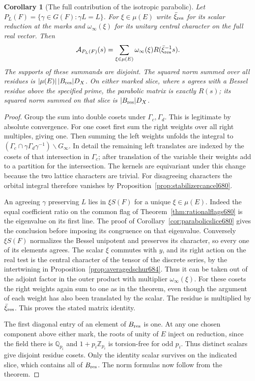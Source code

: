 \documentclass[a4paper,11pt]{article}
\newtheorem{corollary}[proposition]{Corollary}
\theoremstyle{definition}
\theoremstyle{remark}
\numberwithin{equation}{section}
\begin{document}
\begin{corollary}[The full contribution of the isotropic parabolic]\leavevmode
\label{cor:parabolicmass701}
Let \(P_L(F)=\{\gamma\in G(F):\gamma L=L\}\). For
\(\xi\in\mu(E)\) write \(\bar\xi_{\rm res}\) for its scalar
reduction at the marks and \(\omega_\infty(\xi)\) for its
unitary central character on the full real vector. Then
\[
       \mathcal A_{P_L(F)}(s)=
          \sum_{\xi\in\mu(E)}
           \omega_\infty(\xi)R(\bar\xi_{\rm res}^{-1}s).
\]
The supports of these summands are disjoint. The squared norm
summed over all residues is
\(|\mu(E)|\,|B_{\rm res}|D_X\). On either marked slice, where
\(s\) agrees with a Bessel residue above the specified prime,
the parabolic matrix is exactly \(R(s)\); its squared norm
summed on that slice is \(|B_{\rm res}|D_X\).
\end{corollary}
\begin{proof}
Group the sum into double cosets under \(\Gamma_c,\Gamma_d\).
This is legitimate by absolute convergence. For one coset
first sum the right weights over all right multiples, giving
one. Then summing the left weights unfolds the integral to
\((\Gamma_c\cap\gamma\Gamma_d\gamma^{-1})\backslash G_\infty\).
In detail the remaining left translates are indexed by the
cosets of that intersection in \(\Gamma_c\); after translation
of the variable their weights add to a partition for the
intersection. The kernels are equivariant under this change
because the two lattice characters are trivial. For disagreeing
characters the orbital integral therefore vanishes by
Proposition~\ref{prop:stabilizercancel680}.

An agreeing \(\gamma\) preserving \(L\) lies in \(\xi S(F)\)
for a unique \(\xi\in\mu(E)\). Indeed the equal coefficient
ratio on the common flag of Theorem~\ref{thm:rationalflags680}
is the eigenvalue on its first line. The proof of
Corollary~\ref{cor:parabolicslice680} gives the conclusion
before imposing its congruence on that eigenvalue. Conversely
\(\xi S(F)\) normalizes the Bessel unipotent and preserves its
character, so every one of its elements agrees. The scalar
\(\xi\) commutes with \(y\), and its right action on the real
test is the central character of the tensor of the discrete
series, by the intertwining in Proposition~\ref{prop:averagedschur684}.
Thus it can be taken out of the adjoint factor in the outer
product with multiplier \(\omega_\infty(\xi)\). For these
cosets the right weights again sum to one as in the theorem,
even though the argument of each weight has also been
translated by the scalar. The residue is multiplied by
\(\bar\xi_{\rm res}\). This proves the stated matrix identity.

The first diagonal entry of an element of \(B_{\rm res}\) is
one. At any one chosen component above either mark, the roots
of unity of \(E\) inject on reduction, since the field there
is \(\mathbb Q_{p_i}\) and \(1+p_i\mathbb Z_{p_i}\) is
torsion-free for odd \(p_i\). Thus distinct scalars give
disjoint residue cosets. Only the identity scalar survives
on the indicated slice, which contains all of \(B_{\rm res}\).
The norm formulas now follow from the theorem.
\end{proof}
\end{document}
